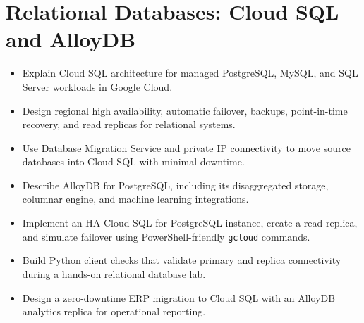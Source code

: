 \chapter{Relational Databases: Cloud SQL and AlloyDB}

\begin{objectives}
\begin{itemize}
    \item Explain Cloud SQL architecture for managed PostgreSQL, MySQL, and SQL Server workloads in Google Cloud.
    \item Design regional high availability, automatic failover, backups, point-in-time recovery, and read replicas for relational systems.
    \item Use Database Migration Service and private IP connectivity to move source databases into Cloud SQL with minimal downtime.
    \item Describe AlloyDB for PostgreSQL, including its disaggregated storage, columnar engine, and machine learning integrations.
    \item Implement an HA Cloud SQL for PostgreSQL instance, create a read replica, and simulate failover using PowerShell-friendly \texttt{gcloud} commands.
    \item Build Python client checks that validate primary and replica connectivity during a hands-on relational database lab.
    \item Design a zero-downtime ERP migration to Cloud SQL with an AlloyDB analytics replica for operational reporting.
\end{itemize}
\end{objectives}

